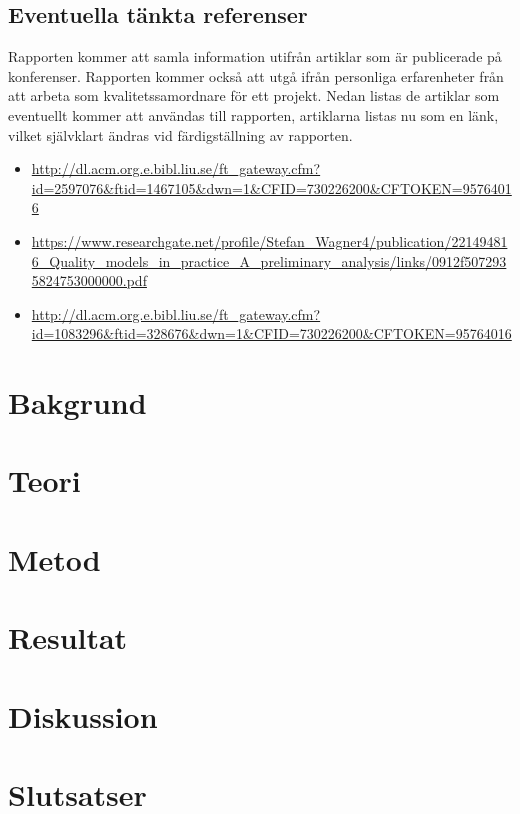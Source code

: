 \subsection{Eventuella tänkta referenser}

Rapporten kommer att samla information utifrån artiklar som är publicerade på konferenser. Rapporten kommer också att utgå ifrån personliga erfarenheter från att arbeta som kvalitetssamordnare för ett projekt. Nedan listas de artiklar som eventuellt kommer att användas till rapporten, artiklarna listas nu som en länk, vilket självklart ändras vid färdigställning av rapporten.

\begin{itemize}
	\item \url{http://dl.acm.org.e.bibl.liu.se/ft_gateway.cfm?id=2597076&ftid=1467105&dwn=1&CFID=730226200&CFTOKEN=95764016}
	\item \url{https://www.researchgate.net/profile/Stefan_Wagner4/publication/221494816_Quality_models_in_practice_A_preliminary_analysis/links/0912f5072935824753000000.pdf}
	\item \url{http://dl.acm.org.e.bibl.liu.se/ft_gateway.cfm?id=1083296&ftid=328676&dwn=1&CFID=730226200&CFTOKEN=95764016}
\end{itemize}

\section{Bakgrund}
\label{sec:background-wallstrom}


\section{Teori}
\label{sec:theory-wallstrom}


\section{Metod}
\label{sec:method-wallstrom}


\section{Resultat}
\label{sec:results-wallstrom}


\section{Diskussion}
\label{sec:discussion-wallstrom}


\section{Slutsatser}
\label{sec:conclusions-wallstrom}


